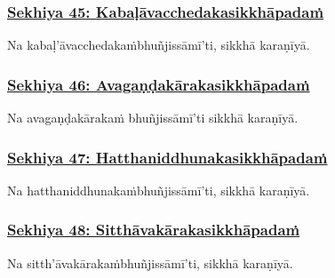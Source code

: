 \subsubsection*{\hyperref[training45]{Sekhiya 45: Kabaḷāvacchedakasikkhāpadaṁ}}
\label{sekh45}

Na kabaḷ'āvacchedakaṁ\makeatletter\hyperlink{endnote498-appendix}\makeatother \thinspace bhuñjissāmī'ti, sikkhā karaṇīyā.



\subsubsection*{\hyperref[training46]{Sekhiya 46: Avagaṇḍakārakasikkhāpadaṁ}}
\label{sekh46}

Na avagaṇḍakārakaṁ bhuñjissāmī'ti sikkhā karaṇīyā.



\subsubsection*{\hyperref[training47]{Sekhiya 47: Hatthaniddhunakasikkhāpadaṁ}}
\label{sekh47}

Na hatthaniddhunakaṁ\makeatletter\hyperlink{endnote499-appendix}\makeatother \thinspace bhuñjissāmī'ti, sikkhā karaṇīyā.



\subsubsection*{\hyperref[training48]{Sekhiya 48: Sitthāvakārakasikkhāpadaṁ}}
\label{sekh48}

Na sitth'āvakārakaṁ\makeatletter\hyperlink{endnote500-appendix}\makeatother \thinspace bhuñjissāmī'ti, sikkhā karaṇīyā.



